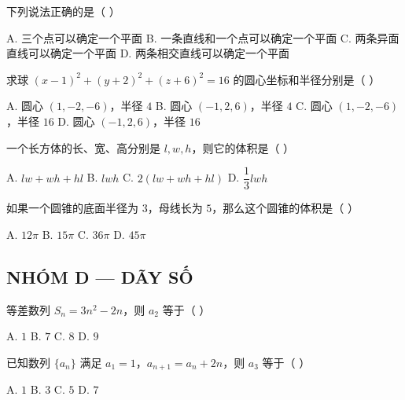 \documentclass[11pt, a4paper]{article}
\begin{document}
\begin{baitap}[16]
下列说法正确的是（ ）
\par\vspace{3pt}
\noindent A. 三个点可以确定一个平面 \quad B. 一条直线和一个点可以确定一个平面 \quad C. 两条异面直线可以确定一个平面 \quad D. 两条相交直线可以确定一个平面
\end{baitap}

\begin{baitap}[17]
求球 $(x-1)^2 + (y+2)^2 + (z+6)^2 = 16$ 的圆心坐标和半径分别是（ ）
\par\vspace{3pt}
\noindent A. 圆心 $(1,-2,-6)$，半径 $4$ \quad B. 圆心 $(-1,2,6)$，半径 $4$ \quad C. 圆心 $(1,-2,-6)$，半径 $16$ \quad D. 圆心 $(-1,2,6)$，半径 $16$
\end{baitap}

\begin{baitap}[18]
一个长方体的长、宽、高分别是 $l, w, h$，则它的体积是（ ）
\par\vspace{3pt}
\noindent A. $lw + wh + hl$ \quad B. $lwh$ \quad C. $2(lw + wh + hl)$ \quad D. $\dfrac{1}{3}lwh$
\end{baitap}

\begin{baitap}[19]
如果一个圆锥的底面半径为 $3$，母线长为 $5$，那么这个圆锥的体积是（ ）
\par\vspace{3pt}
\noindent A. $12\pi$ \quad B. $15\pi$ \quad C. $36\pi$ \quad D. $45\pi$
\end{baitap}

\subsection*{NHÓM D — DÃY SỐ}

\begin{baitap}[20]
等差数列 $S_n = 3n^2 - 2n$，则 $a_2$ 等于（ ）
\par\vspace{3pt}
\noindent A. $1$ \quad B. $7$ \quad C. $8$ \quad D. $9$
\end{baitap}

\begin{baitap}[21]
已知数列 $\{a_n\}$ 满足 $a_1 = 1$，$a_{n+1} = a_n + 2n$，则 $a_3$ 等于（ ）
\par\vspace{3pt}
\noindent A. $1$ \quad B. $3$ \quad C. $5$ \quad D. $7$
\end{baitap}
\end{document}
